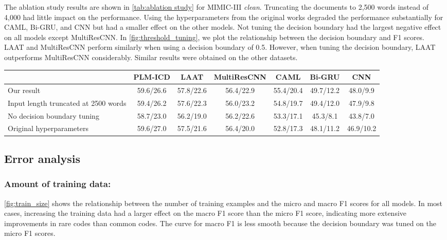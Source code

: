\documentclass[anonymous=false, sigconf=true, review=false, natbib=true]{acmart}
\begin{document}
The ablation study results are shown in \cref{tab:ablation study} for MIMIC-III \textit{clean}. Truncating the documents to 2,500 words instead of 4,000 had little impact on the performance. Using the hyperparameters from the original works degraded the performance substantially for CAML, Bi-GRU, and CNN but had a smaller effect on the other models. Not tuning the decision boundary had the largest negative effect on all models except MultiResCNN. In \cref{fig:threshold_tuning}, we plot the relationship between the decision boundary and F1 scores. LAAT and MultiResCNN perform similarly when using a decision boundary of 0.5. However, when tuning the decision boundary, LAAT outperforms MultiResCNN considerably.
Similar results were obtained on the other datasets. 

\begin{table*}[t]
    \centering
    \caption{Ablation study on MIMIC-III \textit{clean}. The numbers are the micro/macro F1 scores on the test set.}
    \label{tab:ablation study}
    \begin{tabular}{lcccccc}
        \toprule
         & PLM-ICD & LAAT & MultiResCNN & CAML & Bi-GRU & CNN \\
        \midrule
        Our result & 59.6/26.6 & 57.8/22.6 & 56.4/22.9 & 55.4/20.4 & 49.7/12.2 & 48.0/9.9 \\
        \hline
        Input length truncated at 2500 words & 59.4/26.2 & 57.6/22.3 & 56.0/23.2 & 54.8/19.7 & 49.4/12.0 & 47.9/9.8 \\
        No decision boundary tuning & 58.7/23.0 & 56.2/19.0 & 56.2/22.6 & 53.3/17.1 & 45.3/8.1 & 43.8/7.0 \\
        Original hyperparameters & 59.6/27.0 & 57.5/21.6 & 56.4/20.0 & 52.8/17.3 & 48.1/11.2 & 46.9/10.2 \\
        \bottomrule
        \end{tabular}
\end{table*}




\subsection{Error analysis}

\subsubsection{Amount of training data:}


\cref{fig:train_size} shows the relationship between the number of training examples and the micro and macro F1 scores for all models.
In most cases, increasing the training data had a larger effect on the macro F1 score than the micro F1 score, indicating more extensive improvements in rare codes than common codes. The curve for macro F1 is less smooth because the decision boundary was tuned on the micro F1 scores.
\end{document}
